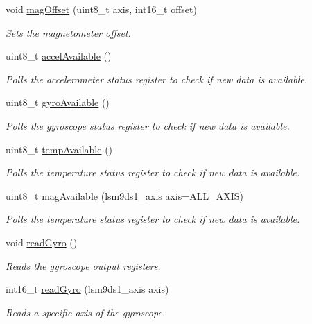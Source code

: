 \begin{DoxyCompactItemize}
void \hyperlink{classLSM9DS1_a0d461614bd058b082c94481dc916c18b}{mag\+Offset} (uint8\+\_\+t axis, int16\+\_\+t offset)
\begin{DoxyCompactList}\small\item\em Sets the magnetometer offset. \end{DoxyCompactList}\item 
uint8\+\_\+t \hyperlink{classLSM9DS1_a515ce6f5c199a86c6aa5be353b2a3a13}{accel\+Available} ()
\begin{DoxyCompactList}\small\item\em Polls the accelerometer status register to check if new data is available. \end{DoxyCompactList}\item 
uint8\+\_\+t \hyperlink{classLSM9DS1_a65b71a03a30f4e8ed1ffd46de3db0560}{gyro\+Available} ()
\begin{DoxyCompactList}\small\item\em Polls the gyroscope status register to check if new data is available. \end{DoxyCompactList}\item 
uint8\+\_\+t \hyperlink{classLSM9DS1_aaf6683c6f3f0281d5222b74f580f321b}{temp\+Available} ()
\begin{DoxyCompactList}\small\item\em Polls the temperature status register to check if new data is available. \end{DoxyCompactList}\item 
uint8\+\_\+t \hyperlink{classLSM9DS1_a85afd29e95bead7b3f0083a9a235d1df}{mag\+Available} (lsm9ds1\+\_\+axis axis=A\+L\+L\+\_\+\+A\+X\+IS)
\begin{DoxyCompactList}\small\item\em Polls the temperature status register to check if new data is available. \end{DoxyCompactList}\item 
void \hyperlink{classLSM9DS1_a56e9710cb538a4c7f7ab94c2ca256ce9}{read\+Gyro} ()
\begin{DoxyCompactList}\small\item\em Reads the gyroscope output registers. \end{DoxyCompactList}\item 
int16\+\_\+t \hyperlink{classLSM9DS1_adc1b37609a6c850328b16da4f911cefd}{read\+Gyro} (lsm9ds1\+\_\+axis axis)
\begin{DoxyCompactList}\small\item\em Reads a specific axis of the gyroscope. \end{DoxyCompactList}\item 

\end{DoxyCompactItemize}
